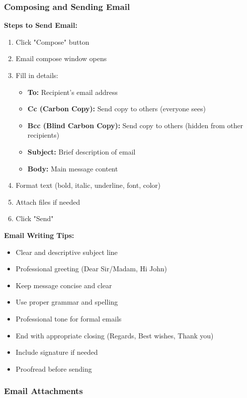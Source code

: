 \documentclass[12pt,a4paper]{article}
\begin{document}
\subsubsection{Composing and Sending Email}

\textbf{Steps to Send Email:}
\begin{enumerate}
    \item Click "Compose" button
    \item Email compose window opens
    \item Fill in details:
    \begin{itemize}
        \item \textbf{To:} Recipient's email address
        \item \textbf{Cc (Carbon Copy):} Send copy to others (everyone sees)
        \item \textbf{Bcc (Blind Carbon Copy):} Send copy to others (hidden from other recipients)
        \item \textbf{Subject:} Brief description of email
        \item \textbf{Body:} Main message content
    \end{itemize}
    \item Format text (bold, italic, underline, font, color)
    \item Attach files if needed
    \item Click "Send"
\end{enumerate}

\textbf{Email Writing Tips:}
\begin{itemize}
    \item Clear and descriptive subject line
    \item Professional greeting (Dear Sir/Madam, Hi John)
    \item Keep message concise and clear
    \item Use proper grammar and spelling
    \item Professional tone for formal emails
    \item End with appropriate closing (Regards, Best wishes, Thank you)
    \item Include signature if needed
    \item Proofread before sending
\end{itemize}

\subsubsection{Email Attachments}
\end{document}
